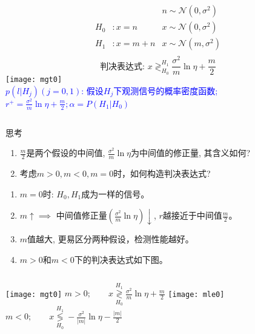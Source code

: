 \begin{frame}
\begin{columns}
	\begin{align*}
	&&n\sim\mathcal{N}(0,\sigma^2)\\ 
	H_0 &:x=n   &x\sim\mathcal{N}(0,\sigma^2)\\
	H_1 &:x=m+n &x\sim\mathcal{N}(m,\sigma^2)\\
	\end{align*}
	\[\text{判决表达式:  } x\mathop{\gtrless}_{H_0}^{H_1}\frac{\sigma^2}{m}\ln\eta+\frac{m}{2} \]
	\texttt{[image: mgt0]}\\
	\scriptsize
	\textcolor{blue}{$p(l|H_j)(j=0,1)$: 假设$H_j$下观测信号的概率密度函数; $r^+=\frac{\sigma^2}{m}\ln\eta+\frac{m}{2}; \alpha=P(H_1|H_0)$}
\end{columns}
\begin{block}{思考}
	\begin{enumerate}
		\item $\frac{m}{2}$是两个假设的中间值, $\frac{\sigma^2}{m}\ln\eta$为中间值的修正量, 其含义如何?
		\item 考虑$m>0,m<0,m=0$时，如何构造判决表达式?
	\end{enumerate} 
\end{block}
\end{frame}

\begin{frame}
\begin{enumerate}
	\item $m=0$时: $H_0,H_1$成为一样的信号。
	\item $m\uparrow\implies$ 中间值修正量$(\frac{\sigma^2}{m}\ln\eta)\downarrow$, $r$越接近于中间值$\frac{m}{2}$。
	\item $m$值越大, 更易区分两种假设，检测性能越好。
	\item $m>0$和$m<0$下的判决表达式如下图。
\end{enumerate}	
\begin{columns}
	\texttt{[image: mgt0]}
	$m>0;\qquad x\mathop{\gtrless}\limits_{H_0}^{H_1}\frac{\sigma^2}{m}\ln\eta+\frac{m}{2}$
	\texttt{[image: mle0]}
	$m<0;\qquad x\mathop{\lessgtr}\limits_{H_0}^{H_1}-\frac{\sigma^2}{|m|}\ln\eta-\frac{|m|}{2}$
\end{columns}
\end{frame}

